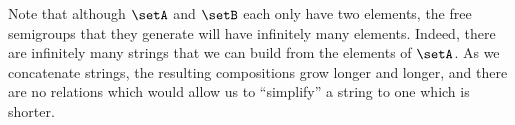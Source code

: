 Note that although $\setA$ and $\setB$ each only have two elements, the free semigroups that they generate will have infinitely many elements.
Indeed, there are infinitely many strings that we can build from the elements of $\setA$.
As we concatenate strings, the resulting compositions grow longer and longer, and there are no relations which would allow us to ``simplify'' a string to one which is shorter.

